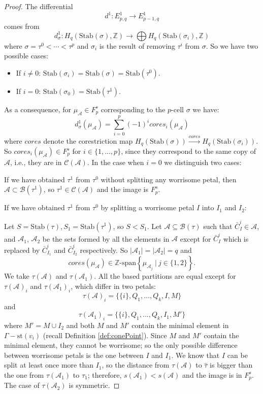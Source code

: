 \documentclass[a4paper]{amsart}
\newcommand{\G}{\Gamma}
\newcommand{\B}{\mathcal{B}}
\newcommand{\au}{\mathcal{A}}
\newcommand{\C}{\mathcal{C}}
\newcommand{\st}{\mathrm{st}}
\newcommand{\Stab}{\mathrm{Stab}}
\theoremstyle{definition}
\theoremstyle{remark}
\begin{document}
\begin{proof}
The differential
$$
d^1:E^1_{p,q}\rightarrow E^1_{p-1,q}
$$
comes from 
$$d^1_\sigma :H_q(\Stab(\sigma),\mathbb{Z})\rightarrow \bigoplus H_q(\Stab(\sigma_i),\mathbb{Z})$$
where $\sigma=\tau^0<\cdots<\tau^p$ and $\sigma_i$ is the result of removing $\tau^i$ from $\sigma$. So we have two possible cases:

\begin{itemize}
    \item If $i\neq 0$: $\Stab(\sigma_i)=\Stab(\sigma)=\Stab(\tau^0)$.
    \item If $i= 0$: $\Stab(\sigma_0)=\Stab(\tau^1)$.
\end{itemize}

As a consequence, for $\mu_\au\in F_p^s$ corresponding to the $p$-cell $\sigma$ we have:
$$
d^1_\sigma(\mu_\au)=\sum_{i=0}^p(-1)^i cores_i(\mu_\au)
$$
where $cores$ denote the corestriction map $
H_q(\Stab(\sigma))\xrightarrow{cores}  H_q(\Stab(\sigma_i))
$. So   $cores_i(\mu_\au)\in F^s_p$ for $i\in\{1,...,p\}$, since they correspond to the same copy of $\au$, i.e., they are in $\C(\au)$. In the case when $i=0$ we distinguish two cases:

    If we have obtained $\tau^1$ from $\tau^0$ without splitting any worrisome petal, then $\au\subset\B(\tau^1)$, so $\tau^1\in\C(\au)$ and the image is $F^s_p$.
   
     If we have obtained $\tau^1$ from $\tau^0$ by splitting a worrisome petal $I$ into $I_1$ and $I_2$: 

    Let $S=\Stab(\tau), S_1=\Stab(\tau^1)$, so $S<S_1$. Let $\au\subseteq\B(\tau)$ such that $\bar{C}_I^i\in\au$, and $\au_1$, $\au_2$ be the sets formed by all the elements in $\au$ except for $\bar{C}_I^i$ which is replaced by $\bar{C}_{I_1}^i$ and $\bar{C}_{I_2}^i$ respectively. So $|\au_1|=|\au_2|=q$ and
$$
cores(\mu_\au)\in\mathbb{Z}\textrm{-span}\left\{\mu_{\au_j}\ | \ j\in\{1,2\}\right\}.
$$
    We take $\tau(\au)$ and $\tau(\au_1)$. All the based partitions are equal except for $\tau(\au)_i$ and $\tau(\au_1)_i$, which differ in two petals:
    $$
    \tau(\au)_i=\{\{i\},Q_1,...,Q_k,I,M\}
    $$
    and
    $$
    \tau(\au_1)_i=\{\{i\},Q_1,...,Q_k,I_1,M'\}
    $$
    where $M'=M\cup I_2$ and both $M$ and $M'$ contain the minimal element in $\G-\st(v_i)$ (recall Definition \ref{def:conePoint}). Since $M$ and $M'$ contain the minimal element, they cannot be worrisome; so the only possible difference between worrisome petals is the one between $I$ and $I_1$. We know that $I$ can be split at least once more than $I_1$, so the distance from $\tau(\au)$ to $\widehat{\tau}$ is bigger than the one from $\tau(\au_1)$ to $\widehat{\tau}_1$; therefore, $s(\au_1)<s(\au)$ and the image is in $F^s_p$. The case of $\tau(\au_2)$ is symmetric.
\end{proof}
\end{document}

